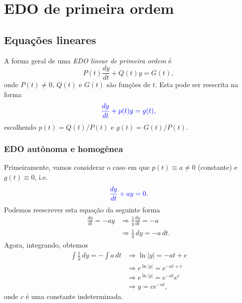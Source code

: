 
\chapter{EDO de primeira ordem}\label{cap_edo1ordem}
\thispagestyle{fancy}

\section{Equações lineares}\label{cap_edo1ordem_sec_eqlinear}

A forma geral de uma \emph{EDO linear de primeira ordem} é
\begin{equation}
  P(t)\frac{dy}{dt} + Q(t)y = G(t),
\end{equation}
onde $P(t) \neq 0$, $Q(t)$ e $G(t)$ são funções de $t$. Esta pode ser reescrita na forma
\begin{equation}
  \color{blue}{\frac{dy}{dt} + p(t)y = g(t)},
\end{equation}
escolhendo $p(t) = Q(t)/P(t)$ e $g(t) = G(t)/P(t)$.

\subsection{EDO autônoma e homogênea}

Primeiramente, vamos considerar o caso em que $p(t) \equiv a \neq 0$ (constante) e $g(t) \equiv 0$, i.e.
\begin{equation}\label{eq:edo1linear_pc_g0}
  \color{blue}{\frac{dy}{dt} + ay = 0.}
\end{equation}
Podemos reescrever esta equação da seguinte forma
\begin{align}
  \frac{dy}{dt} = -ay &\Rightarrow \frac{1}{y}\frac{dy}{dt} = -a \\
                     &\Rightarrow \frac{1}{y}\,dy = -a\,dt.
\end{align}
Agora, integrando, obtemos
\begin{align}
  \int \frac{1}{y}\,dy = -\int a\,dt &\Rightarrow \ln|y| = -at + c \\
                                    &\Rightarrow e^{\ln|y|} = e^{-at + c} \\
                                    &\Rightarrow e^{\ln|y|} = e^{-at}e^c \\
                                    &\Rightarrow y = ce^{-at},
\end{align}
onde $c$ é uma constante indeterminada.

